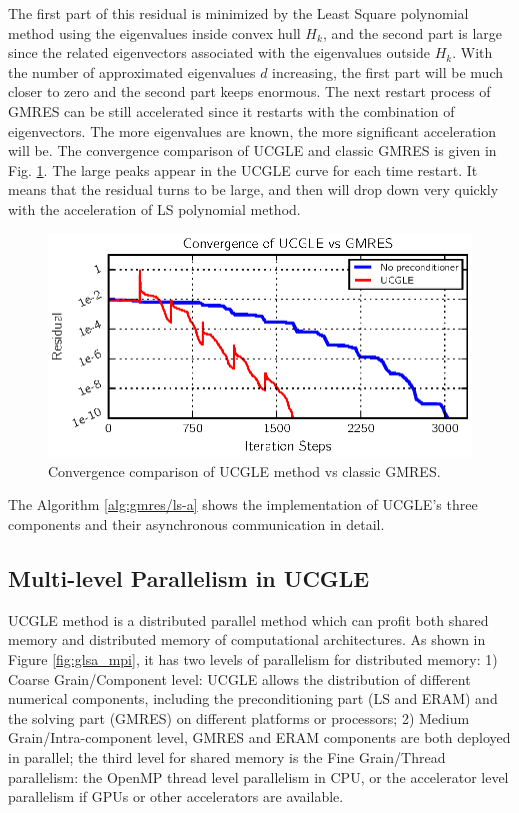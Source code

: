 The first part of this residual is minimized by the Least Square polynomial method using the eigenvalues inside convex hull $H_k$, and the second part is large since the related eigenvectors associated with the eigenvalues outside $H_k$. With the number of approximated eigenvalues $d$ increasing, the first part will be much closer to zero and the second part keeps enormous. The next restart process of GMRES can be still accelerated since it restarts with the combination of eigenvectors. The more eigenvalues are known, the more significant acceleration will be. The convergence comparison of UCGLE and classic GMRES is given in Fig. \ref{fig:conv}. The large peaks appear in the UCGLE curve for each time restart. It means that the residual turns to be large, and then will drop down very quickly with the acceleration of LS polynomial method.

\begin{figure}[htbp]
	\centering
	\includegraphics[width=6.2in]{fig/conv.eps}
	\caption{Convergence comparison of UCGLE method vs classic GMRES.}
	\label{fig:conv}
\end{figure}

The Algorithm \ref{alg:gmres/ls-a} shows the implementation of UCGLE's three components and their asynchronous communication in detail. 


\subsection{Multi-level Parallelism in UCGLE}

UCGLE method is a distributed parallel method which can profit both shared memory and distributed memory of computational architectures. As shown in Figure \ref{fig:glsa_mpi}, it has two levels of parallelism for distributed memory: 1) Coarse Grain/Component level: UCGLE allows the distribution of different numerical components, including the preconditioning part (LS and ERAM) and the solving part (GMRES) on different platforms or processors; 2) Medium Grain/Intra-component level, GMRES and ERAM components are both deployed in parallel; the third level for shared memory is the Fine Grain/Thread parallelism: the OpenMP thread level parallelism in CPU, or the accelerator level parallelism if GPUs or other accelerators are available. 

